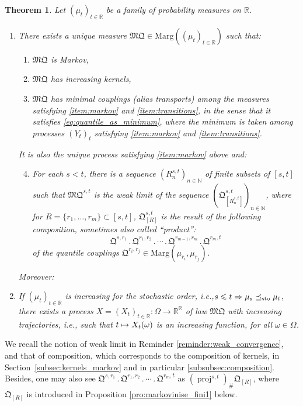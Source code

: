 \documentclass[11pt]{article}
\newcommand{\ie}{i.e.,\xspace}
\newcommand{\ldot}{\mathbin{.}}
\newcommand{\lcdots}{\ldot\cdots\ldot}
\newcommand\mto{\mathchoice{\longmapsto}{\mapsto}{\mapsto}{\mapsto}}
\theoremstyle{plain}
\newtheorem{themBJ}{Theorem}
\theoremstyle{definition}
\newcommand{\como}{\mathfrak{Q}}
\newcommand{\mq}{\mathfrak{MQ}}
\newcommand{\ma}{\mathrm{Marg}}
\newcommand{\R}{\mathbb{R}}
\newcommand{\N}{\mathbb{N}}
\newcommand{\leqs}{\preceq_{\text{\rm sto}}}
\newcommand{\pr}{\operatorname{proj}}
\begin{document}
\begin{themBJ}\label{them:a}
Let $(\mu_t)_{t\in\R}$ be a family of probability measures on $\R$.\begin{enumerate}
\item
\label{p1:them:a} There exists a unique measure $\mq\in \ma((\mu_t)_{t\in \R})$ such that:
\begin{enumerate}
\item
\label{item:markov}
$\mq$ is Markov,
\item
\label{item:transitions}
$\mq$ has increasing kernels,
\item\label{item:minimal}
$\mq$ has minimal couplings (alias transports) among the measures satisfying \eqref{item:markov} and \eqref{item:transitions}, in the sense that it satisfies \eqref{eq:quantile_as_minimum}, where the minimum is taken among processes $(Y_t)_t$ satisfying \eqref{item:markov} and \eqref{item:transitions}.
\end{enumerate}

\noindent It is also the unique process satisfying \eqref{item:markov} above and:
\begin{enumerate}
\setcounter{enumii}{3}
\item\label{item:limite_de_compose}
For each $s<t$, there is a sequence $(R^{s,t}_n)_{n\in \N}$ of finite subsets of $[s,t]$ such that $\mq^{s,t}$ is the weak limit of the sequence $(\como_{[R^{s,t}_n]}^{s,t})_{n\in \N}$, where for $R=\{r_1,\ldots,r_m\}\subset[s,t]$, $\como_{[R]}^{s,t}$
is the result of the following composition, sometimes also called ``product'':
\[\como^{s,r_1}{}\ldot\como^{r_1,r_2}\lcdots \como^{r_{m-1},r_m}{}\ldot\como^{r_{m},t}\]
of the quantile couplings $\como^{r_i,r_j}\in\ma(\mu_{r_i},\mu_{r_j})$.
\end{enumerate}

\noindent Moreover:

\item
\label{item:croissant} If $(\mu_t)_{t\in \R}$ is increasing for the stochastic order, \ie $s\leqslant t\Rightarrow\mu_s\leqs \mu_t$, there exists a process $X=(X_{t})_{t\in\R}:\Omega\to\R^\R$ of law $\mq$ with increasing trajectories, \ie such that $t\mto X_t(\omega)$ is an increasing function, for all $\omega\in\Omega$.
\end{enumerate}
\end{themBJ}

We recall the notion of weak limit in Reminder \ref{reminder:weak_convergence}, and that of composition, which corresponds to the composition of kernels, in Section~\ref{subsec:kernels_markov} and in particular \ref{subsubsec:composition}. Besides, one may also see $\como^{s,r_1}{}\ldot\como^{r_1,r_2}\lcdots \como^{r_{m},t}$ as $(\pr^{s,t})_\#\como_{[R]}$, where $\como_{[R]}$ is introduced in Proposition \ref{pro:markovinise_fini1} below.
\end{document}
